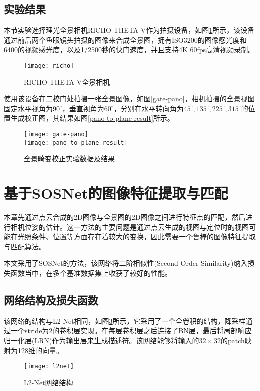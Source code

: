 \subsection{实验结果}
本节实验选择理光全景相机RICHO THETA V作为拍摄设备，如图\ref{richo}所示，该设备通过前后两个鱼眼镜头拍摄的图像来合成全景图，拥有ISO3200的图像感光度和6400的视频感光度，以及1/2500秒的快门速度，并且支持4K 60fps高清视频录制。
\begin{figure}
	\centering
	\texttt{[image: richo]}
	\caption{RICHO THETA V全景相机}
	\label{richo}
\end{figure}

使用该设备在二校门处拍摄一张全景图像，如图\ref{gate-pano}，相机拍摄的全景视图固定水平视角为$90^\circ$，垂直视角为$60^\circ$，分别在水平转向角为$45^\circ, 135^\circ, 225^\circ, 315^\circ$的位置生成校正图，其结果如图\ref{pano-to-plane-result}所示。
\begin{figure}
	\centering
		{\texttt{[image: gate-pano]}}\\
	{\texttt{[image: pano-to-plane-result]}}
	\caption{全景畸变校正实验数据及结果}
	\label{pano2plane-data-result}
\end{figure}

\section{基于SOSNet的图像特征提取与匹配}
本章先通过点云合成的2D图像与全景图的2D图像之间进行特征点的匹配，然后进行相机位姿的估计。这一方法的主要问题是通过点云生成的视图与定位时的视图可能在光照条件、位置等方面存在着较大的变换，因此需要一个鲁棒的图像特征提取与匹配算法。

本文采用了SOSNet的方法，该网络将二阶相似性(Second Order Similarity)纳入损失函数当中，在多个基准数据集上收获了较好的性能。
\subsection{网络结构及损失函数}
该网络的结构与L2-Net\cite{tian2017l2}相同，如图\ref{l2net}所示，它采用了一个全卷积的结构，降采样通过一个stride为2的卷积层实现。在每层卷积层之后连接了BN层，最后将局部响应归一化层(LRN)\cite{krizhevsky2012imagenet}作为输出层来生成描述符。该网络能够将输入的$32\times 32$的patch映射为128维的向量。
\begin{figure}
	\centering
	\texttt{[image: l2net]}
	\caption{L2-Net网络结构}
	\label{l2net}
\end{figure}

